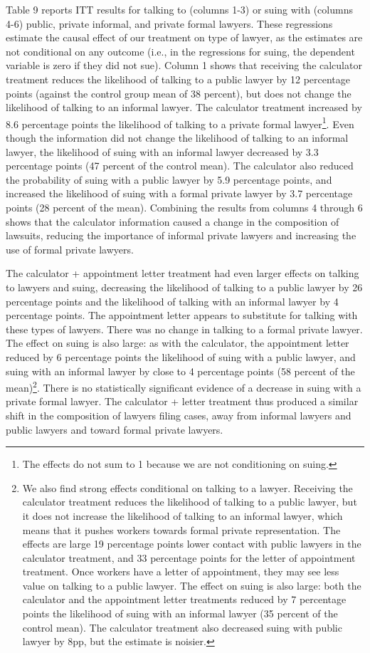 \documentclass[12 pt]{article}
\begin{document}
Table 9 reports ITT results for talking to (columns 1-3) or suing with (columns 4-6) public, private informal, and private formal lawyers. These regressions estimate the causal effect of our treatment on type of lawyer, as the estimates are not conditional on any outcome (i.e., in the regressions for suing, the dependent variable is zero if they did not sue). Column 1 shows that receiving the calculator treatment reduces the likelihood of talking to a public lawyer by 12 percentage points (against the control group mean of 38 percent), but does not change the likelihood of talking to an informal lawyer. The calculator treatment increased by 8.6 percentage points the likelihood of talking to a private formal lawyer\footnote{The effects do not sum to 1 because we are not conditioning on suing.}.  Even though the information did not change the likelihood of talking to an informal lawyer, the likelihood of suing with an informal lawyer decreased by 3.3 percentage points (47 percent of the control mean). The calculator also reduced the probability of suing with a public lawyer by 5.9 percentage points, and increased the likelihood of suing with a formal private lawyer by 3.7 percentage points (28 percent of the mean). Combining the results from columns 4 through 6 shows that the calculator information caused a change in the composition of lawsuits, reducing the importance of informal private lawyers and increasing the use of formal private lawyers. 

The calculator + appointment letter treatment had even larger effects on talking to lawyers and suing, decreasing the likelihood of talking to a public lawyer by 26 percentage points and the likelihood of talking with an informal lawyer by 4 percentage points. The appointment letter appears to substitute for talking with these types of lawyers. There was no change in talking to a formal private lawyer. The effect on suing is also large: as with the calculator, the appointment letter reduced by 6 percentage points the likelihood of suing with a public lawyer, and suing with an informal lawyer by close to 4 percentage points (58 percent of the mean)\footnote{We also find strong effects conditional on talking to a lawyer. Receiving the calculator treatment reduces the likelihood of talking to a public lawyer, but it does not increase the likelihood of talking to an informal lawyer, which means that it pushes workers towards formal private representation. The effects are large 19 percentage points lower contact with public lawyers in the calculator treatment, and 33 percentage points for the letter of appointment treatment. Once workers have a letter of appointment, they may see less value on talking to a public lawyer. The effect on suing is also large: both the calculator and the appointment letter treatments reduced by 7 percentage points the likelihood of suing with an informal lawyer (35 percent of the control mean). The calculator treatment also decreased suing with public lawyer by 8pp, but the estimate is noisier.}.  There is no statistically significant evidence of a decrease in suing with a private formal lawyer. The calculator + letter treatment thus produced a similar shift in the composition of lawyers filing cases, away from informal lawyers and public lawyers and toward formal private lawyers.
\end{document}
